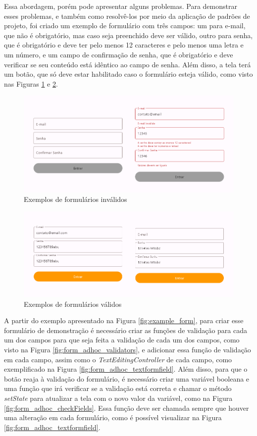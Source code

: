 \documentclass[12pt, %
openright, 
oneside, %
a4paper,    %
brazil]{facom-ufu-abntex2}
\begin{document}
Essa abordagem, porém pode apresentar alguns problemas. Para demonstrar esses problemas, e também como resolvê-los por meio da aplicação de padrões de projeto, foi criado um exemplo de formulário com três campos: um para e-mail, que não é obrigatório, mas caso seja preenchido deve ser válido, outro para senha, que é obrigatório e deve ter pelo menos 12 caracteres e pelo menos uma letra e um número, e um campo de confirmação de senha, que é obrigatório e deve verificar se seu conteúdo está idêntico ao campo de senha. Além disso, a tela terá um botão, que só deve estar habilitado caso o formulário esteja válido, como visto nas Figuras \ref{fig:form_preview_invalid} e \ref{fig:form_preview_valid}.

\begin{figure}[ht]
    \centering
    \includegraphics[width=.65\textwidth]{figures/forms/form_preview_invalid.png}
    \caption{Exemplos de formulários inválidos}
    \label{fig:form_preview_invalid}
\end{figure}

\begin{figure}[ht]
    \centering
    \includegraphics[width=.65\textwidth]{figures/forms/form_preview_valid.png}
    \caption{Exemplos de formulários válidos}
    \label{fig:form_preview_valid}
\end{figure}

A partir do exemplo apresentado na Figura \ref{fig:example_form}, para criar esse formulário de demonstração é necessário criar as funções de validação para cada um dos campos para que seja feita a validação de cada um dos campos, como visto na Figura \ref{fig:form_adhoc_validators}, e adicionar essa função de validação em cada campo, assim como o \textit{TextEditingController} de cada campo, como exemplificado na Figura \ref{fig:form_adhoc_textformfield}. Além disso, para que o botão reaja à validação do formulário, é necessário criar uma variável booleana e uma função que irá verificar se a validação está correta e chamar o método \textit{setState} para atualizar a tela com o novo valor da variável, como na Figura \ref{fig:form_adhoc_checkFields}. Essa função deve ser chamada sempre que houver uma alteração em cada formulário, como é possível visualizar na Figura \ref{fig:form_adhoc_textformfield}.
\end{document}
